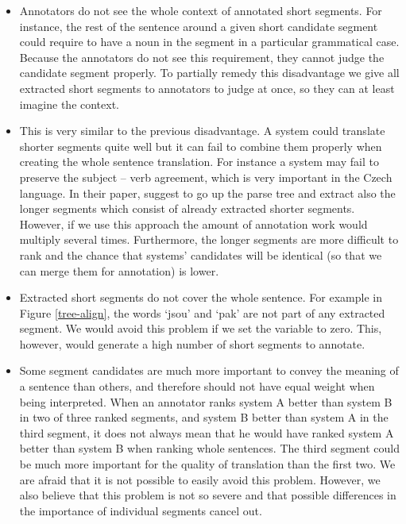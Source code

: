 \begin{itemize}

  \item Annotators do not see the whole context of annotated short segments.
    For instance, the rest of the sentence around a given short candidate segment
    could require to have a noun in the segment in a particular grammatical
    case. Because the annotators do not see this requirement, they cannot judge the
    candidate segment properly.  To partially remedy this disadvantage we
    give all extracted short segments to annotators to judge at once, so they
    can at least imagine the context.

  \item This is very similar to the previous disadvantage. A system could
    translate shorter segments quite well but it can fail to combine them
    properly when creating the whole sentence translation. For instance a
    system may fail to preserve the subject -- verb agreement, which is very
    important in the Czech language.  In their paper,
     suggest to go up the parse tree and extract
    also the longer segments which consist of already extracted shorter
    segments. However, if we use this approach the amount of annotation work
    would multiply several times. Furthermore, the longer segments are more
    difficult to rank and the chance that systems' candidates will be identical
    (so that we can merge them for annotation) is lower.

  \item Extracted short segments do not cover the whole sentence. For example
    in Figure \ref{tree-align}, the words `jsou' and `pak' are not part of any
    extracted segment. We would avoid this problem if we set the variable
     to zero. This, however, would generate a high number of short
    segments to annotate.

  \item Some segment candidates are much more important to convey the meaning
    of a sentence than others, and therefore should not have equal weight when
    being interpreted. When an annotator ranks system A better than system B in
    two of three ranked segments, and system B better than system A in the
    third segment, it does not always mean that he would have ranked system A
    better than system B when ranking whole sentences. The third segment could
    be much more important for the quality of translation than the first two.
    We are afraid that it is not possible to easily avoid this problem.
    However, we also believe that this problem is not so severe and that
    possible differences in the importance of individual segments cancel out.

\end{itemize}

